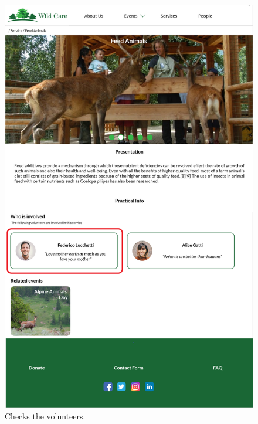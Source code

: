 	\begin{figure}[h!]
		\centering
		\begin{minipage}[b]{1\textwidth}
    			\includegraphics[width=\textwidth]{./assets/mockups/servicedetails_persondetails.png}
			\caption{Checks the volunteers.}
		\end{minipage}
	\end{figure}

